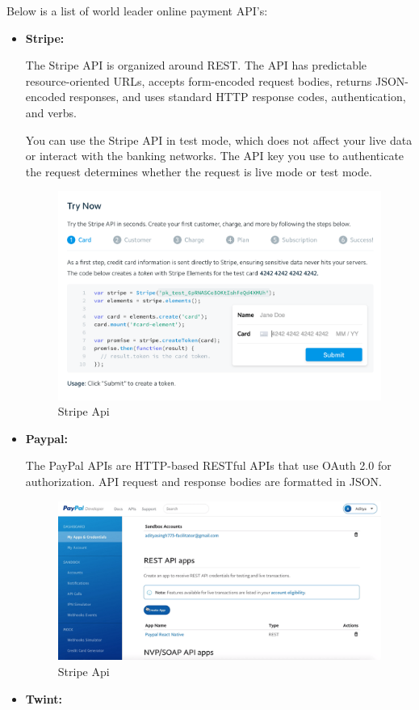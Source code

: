 \begin{spacing}{1.2}
Below is a list of world leader online payment API's:
\begin{itemize}
  \item \textbf{Stripe:}
 
 The Stripe API is organized around REST. The API has predictable resource-oriented URLs, accepts form-encoded request bodies, returns JSON-encoded responses, and uses standard HTTP response codes, authentication, and verbs.

You can use the Stripe API in test mode, which does not affect your live data or interact with the banking networks. The API key you use to authenticate the request determines whether the request is live mode or test mode.

\begin{figure}[!ht]\centering
\includegraphics[scale=0.3]{images/stripe.png}
\caption{Stripe Api}
\label{fig:fig1}
\end{figure}

  \item \textbf{Paypal:}
  
  The PayPal APIs are HTTP-based RESTful APIs that use OAuth 2.0 for authorization. API request and response bodies are formatted in JSON.
  
\begin{figure}[!ht]\centering
\includegraphics[scale=0.3]{images/PayPal.png}
\caption{Stripe Api}
\label{fig:fig1}
\end{figure}
\newpage
\item \textbf{Twint:}


\end{itemize}
\end{spacing}
